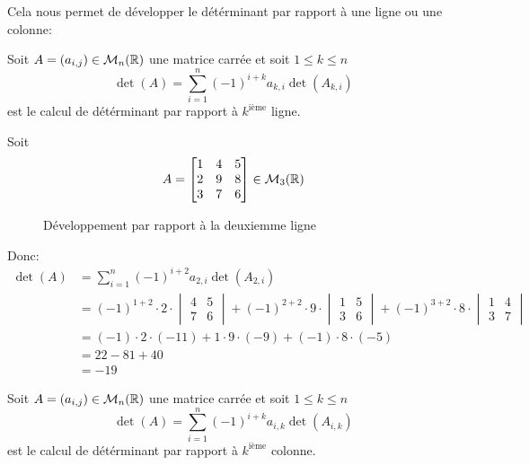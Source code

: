 Cela nous permet de développer le détérminant par rapport à une ligne ou une colonne:
\begin{prop}
    Soit $A = (a_{i, j}) \in \mathcal{M}_n(\mathbb{R})$ une matrice carrée et soit $1 \le k \le n$
    \[
        \displaystyle \det(A) = \sum_{i=1}^{n} (-1)^{i + k} a_{k,i} \det(A_{k, i}) 
    \] 
    est le calcul de détérminant par rapport à $k^{\text{ième}}$ ligne.
\end{prop}
\begin{eg}
   Soit  
   \[
   A = 
   \begin{bmatrix} 
       1 & 4 & 5\\
       2 & 9 & 8\\
       3 & 7 & 6
   \end{bmatrix} \in \mathcal{M}_3(\mathbb{R})
   \] 
\begin{figure}[H]
    \centering
    \caption{Développement par rapport à la deuxiemme ligne}
    \label{fig:mat-ligne-1-colonne-3}
\end{figure}
Donc:
\begin{align*}
    \det(A) &= \sum_{i=1}^{n} (-1)^{i + 2} a_{2, i} \det(A_{2, i}) \\
            &= (-1)^{1 + 2} \cdot 2 \cdot \begin{vmatrix} 4 & 5 \\ 7 & 6 \end{vmatrix} + (-1)^{2 + 2} \cdot 9 \cdot \begin{vmatrix} 1 & 5 \\ 3 & 6 \end{vmatrix}  + (-1)^{3 + 2} \cdot 8 \cdot \begin{vmatrix} 1 & 4 \\ 3 & 7 \end{vmatrix} \\
            &= (-1) \cdot 2 \cdot (-11) + 1 \cdot 9 \cdot (-9) + (-1) \cdot 8 \cdot (-5)\\
            &= 22 - 81 + 40\\
            &= -19
\end{align*}
\end{eg}

\begin{prop}
    Soit $A = (a_{i, j}) \in \mathcal{M}_n(\mathbb{R})$ une matrice carrée et soit $1 \le k \le n$
    \[
        \displaystyle \det(A) = \sum_{i=1}^{n} (-1)^{i + k} a_{i,k} \det(A_{i,k}) 
    \] 
    est le calcul de détérminant par rapport à $k^{\text{ième}}$ colonne.
\end{prop}

